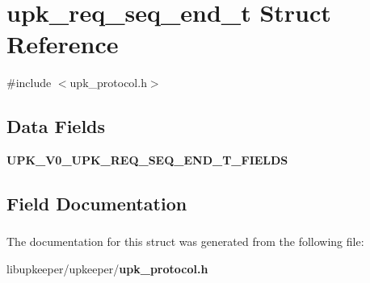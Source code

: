 \section{upk\_\-req\_\-seq\_\-end\_\-t Struct Reference}
\label{structupk__req__seq__end__t}


{\ttfamily \#include $<$upk\_\-protocol.h$>$}

\subsection*{Data Fields}
\begin{DoxyCompactItemize}
\item 
{\bf UPK\_\-V0\_\-UPK\_\-REQ\_\-SEQ\_\-END\_\-T\_\-FIELDS}
\end{DoxyCompactItemize}


\subsection{Field Documentation}
\subsubsection[{UPK\_\-V0\_\-UPK\_\-REQ\_\-SEQ\_\-END\_\-T\_\-FIELDS}]{}\label{structupk__req__seq__end__t_ad88003bbd45ae9b26798b9050675b8c4}


The documentation for this struct was generated from the following file:\begin{DoxyCompactItemize}
\item 
libupkeeper/upkeeper/{\bf upk\_\-protocol.h}\end{DoxyCompactItemize}
